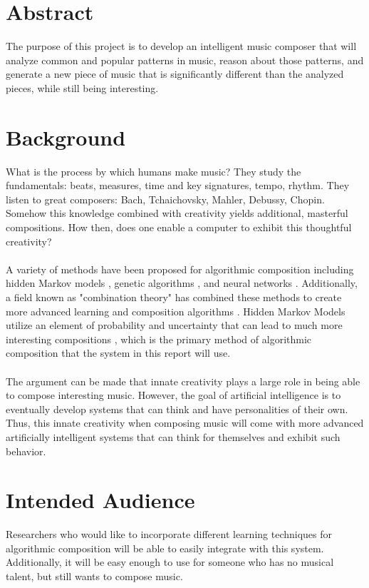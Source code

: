 \documentclass{article}
\begin{document}
\printglossary[title=Terms and Abbreviations,toctile=Terms and Abbreviations]
\newpage

\section{Abstract}
The purpose of this project is to develop an intelligent music composer that will analyze common and popular patterns in music, reason about those patterns, and generate a new piece of music that is significantly different than the analyzed pieces, while still being interesting.

\section{Background}
What is the process by which humans make music? They study the fundamentals: beats, measures, time and key signatures, tempo, rhythm. They listen to great composers: Bach, Tchaichovsky, Mahler, Debussy, Chopin. Somehow this knowledge combined with creativity yields additional, masterful compositions. How then, does one enable a computer to exhibit this thoughtful creativity?\\
\\
A variety of methods have been proposed for algorithmic composition including hidden Markov models \cite{5492670}, genetic algorithms \cite{514161}, and neural networks \cite{4667040}. Additionally, a field known as "combination theory" has combined these methods to create more advanced learning and composition algorithms \cite{4626654}. Hidden Markov Models utilize an element of probability and uncertainty that can lead to much more interesting compositions
\cite{5492670}, which is the primary method of algorithmic composition that the system in this report will use.\\
\\
The argument can be made that innate creativity plays a large role in being able to compose interesting music.  However, the goal of artificial intelligence is to eventually develop systems that can think and have personalities of their own.  Thus, this innate creativity when composing music will come with more advanced artificially intelligent systems that can think for themselves and exhibit such behavior.

\section{Intended Audience}
Researchers who would like to incorporate different learning techniques for algorithmic composition will be able to easily integrate with this system. Additionally, it will be easy enough to use for someone who has no musical talent, but still wants to compose music.
\end{document}
